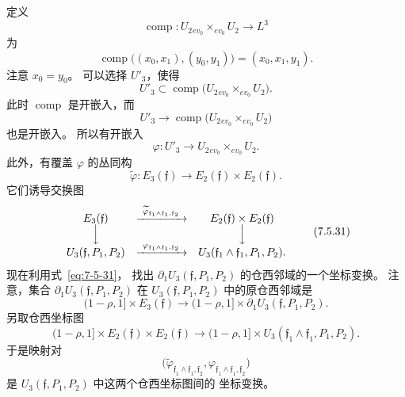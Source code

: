定义
\[
\operatorname{comp}\colon
U_2{}_{ev_0}\!\mathbin{\times_{ev_0}}U_2
\longrightarrow L^3
\]
为
\begin{equation}
\operatorname{comp}
\bigl((x_0,x_1),(y_0,y_1)\bigr)
=(x_0,x_1,y_1).
\tag{7.5.29}\label{eq:7-5-29}
\end{equation}
注意 $x_0=y_0$。
可以选择 $U'_3$，使得
\[
U'_3\subset
\operatorname{comp}
\bigl(U_2{}_{ev_0}\!\mathbin{\times_{ev_0}}U_2\bigr).
\]
此时 $\operatorname{comp}$ 是开嵌入，而
\[
U'_3\longrightarrow
\operatorname{comp}
\bigl(U_2{}_{ev_0}\!\mathbin{\times_{ev_0}}U_2\bigr)
\]
也是开嵌入。
所以有开嵌入
\begin{equation}
\varphi\colon U'_3\longrightarrow
U_2{}_{ev_0}\!\mathbin{\times_{ev_0}}U_2.
\tag{7.5.30}\label{eq:7-5-30}
\end{equation}
此外，有覆盖 $\varphi$ 的丛同构
\[
\widetilde\varphi\colon
E_3(\mathfrak f)
\longrightarrow E_2(\mathfrak f)\times E_2(\mathfrak f).
\]
它们诱导交换图
\begin{equation}
\begin{array}{ccc}
E_3(\mathfrak f)
&\xrightarrow{
\ \widetilde\varphi_{\mathfrak f_1\wedge\mathfrak f_1,\mathfrak f_2}\ }
&E_2(\mathfrak f)\times E_2(\mathfrak f)
\\[-0.1em]
\Big\downarrow&&\Big\downarrow
\\[-0.1em]
U_3(\mathfrak f,P_1,P_2)
&\xrightarrow{
\ \varphi_{\mathfrak f_1\wedge\mathfrak f_1,\mathfrak f_2}\ }
&U_3(\mathfrak f_1\wedge\mathfrak f_1,P_1,P_2).
\end{array}
\tag{7.5.31}\label{eq:7-5-31}
\end{equation}
现在利用式~\eqref{eq:7-5-31}，
找出 $\partial_1U_3(\mathfrak f,P_1,P_2)$
的仓西邻域的一个坐标变换。
注意，集合 $\partial_1U_3(\mathfrak f,P_1,P_2)$
在 $U_3(\mathfrak f,P_1,P_2)$ 中的原仓西邻域是
\begin{equation}
(1-\rho,1]\times E_3(\mathfrak f)
\longrightarrow
(1-\rho,1]\times\partial_1U_3(\mathfrak f,P_1,P_2).
\tag{7.5.32.1}\label{eq:7-5-32-1}
\end{equation}
另取仓西坐标图
\begin{equation}
(1-\rho,1]\times E_2(\mathfrak f)\times E_2(\mathfrak f)
\longrightarrow
(1-\rho,1]\times
U_3(\mathfrak f_1\wedge\mathfrak f_1,P_1,P_2).
\tag{7.5.32.2}\label{eq:7-5-32-2}
\end{equation}
于是映射对
\[
\bigl(
\widetilde\varphi_{\mathfrak f_1\wedge\mathfrak f_1,\mathfrak f_2},
\varphi_{\mathfrak f_1\wedge\mathfrak f_1,\mathfrak f_2}
\bigr)
\]
是 $U_3(\mathfrak f,P_1,P_2)$ 中这两个仓西坐标图间的
坐标变换。

